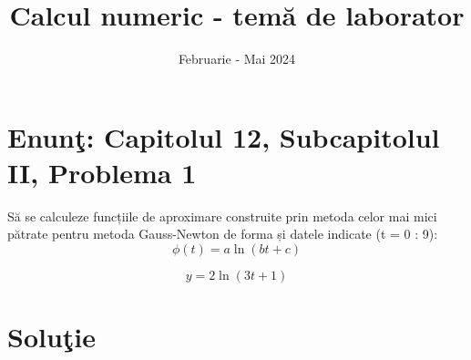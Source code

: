 \documentclass{article}
\begin{document}
\title{Calcul numeric - tem\u{a} de laborator}

\author{}

\date{Februarie - Mai 2024}

\maketitle              %








\section*{Enun\c{t}: Capitolul 12, Subcapitolul II, Problema 1}

S\u{a} se calculeze funcțiile de aproximare construite prin metoda celor mai
mici pătrate pentru metoda Gauss-Newton de forma și datele indicate (t = 0 : 9):
\[
\phi(t) = a \ln(bt + c)
\]

\[
y = 2 \ln(3t + 1)
\] 

\section*{Solu\c{t}ie}
\end{document}
